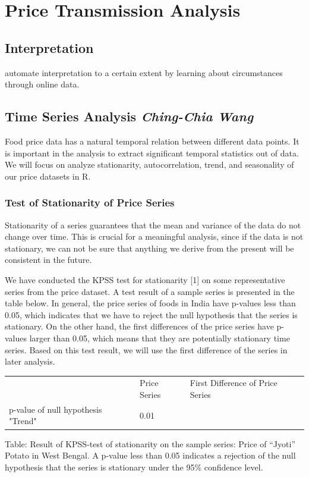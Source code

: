 \section*{Price Transmission Analysis}

\subsection*{Interpretation}
automate interpretation to a certain extent by learning about circumstances through online data.

\subsection*{Time Series Analysis \footnotesize\textit{Ching-Chia Wang}}
Food price data has a natural temporal relation between different data points. It is important in the analysis to extract significant temporal statistics out of data. We will focus on analyze stationarity, autocorrelation, trend, and seasonality of our price datasets in R.

\subsubsection*{Test of Stationarity of Price Series}
Stationarity of a series guarantees that the mean and variance of the data do not change over time. This is crucial for a meaningful analysis, since if the data is not stationary, we can not be sure that anything we derive from the present will be consistent in the future.

We have conducted the KPSS test for stationarity [1] on some representative series from the price dataset. A test result of a sample series is presented in the table below. In general, the price series of foods in India have p-values less than 0.05, which indicates that we have to reject the null hypothesis that the series is stationary. On the other hand, the first differences of the price series have p-values larger than 0.05, which means that they are potentially stationary time series. Based on this test result, we will use the first difference of the series in later analysis.

\begin{table}[h]
\begin{tabular}{lll}
\cline{1-1}
\multicolumn{1}{|l|}{}             & Price Series & First Difference of Price Series \\ \cline{1-1}
p-value of null hypothesis "Trend" & 0.01         &
\end{tabular}
\end{table}
Table: Result of KPSS-test of stationarity on the sample series: Price of “Jyoti” Potato in West Bengal. A p-value less than 0.05 indicates a rejection of the null hypothesis that the series is stationary under the 95\% confidence level.

